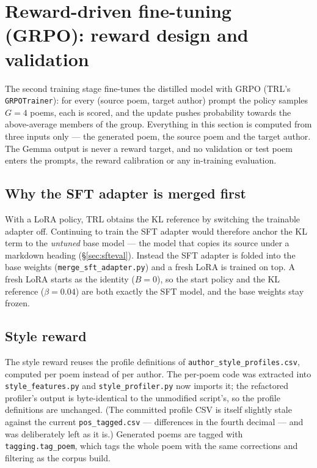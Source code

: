 \documentclass[11pt]{article}
\begin{document}
\section{Reward-driven fine-tuning (GRPO): reward design and
validation}\label{sec:grpo}

The second training stage fine-tunes the distilled model with GRPO (TRL's
\texttt{GRPOTrainer}): for every (source poem, target author) prompt the
policy samples $G=4$ poems, each is scored, and the update pushes probability
towards the above-average members of the group. Everything in this section is
computed from three inputs only --- the generated poem, the source poem and
the target author. The Gemma output is never a reward target, and no
validation or test poem enters the prompts, the reward calibration or any
in-training evaluation.

\subsection{Why the SFT adapter is merged first}

With a LoRA policy, TRL obtains the KL reference by switching the trainable
adapter off. Continuing to train the SFT adapter would therefore anchor the
KL term to the \emph{untuned} base model --- the model that copies its
source under a markdown heading (\S\ref{sec:sfteval}). Instead the SFT
adapter is folded into the base weights (\texttt{merge\_sft\_adapter.py})
and a fresh LoRA is trained on top. A fresh LoRA starts as the identity
($B=0$), so the start policy and the KL reference ($\beta=0.04$) are both
exactly the SFT model, and the base weights stay frozen.

\subsection{Style reward}

The style reward reuses the profile definitions of
\texttt{author\_style\_profiles.csv}, computed per poem instead of per author.
The per-poem code was extracted into \texttt{style\_features.py} and
\texttt{style\_profiler.py} now imports it; the refactored profiler's output
is byte-identical to the unmodified script's, so the profile definitions are
unchanged. (The committed profile CSV is itself slightly stale against the
current \texttt{pos\_tagged.csv} --- differences in the fourth decimal --- and
was deliberately left as it is.) Generated poems are tagged with
\texttt{tagging.tag\_poem}, which tags the whole poem with the same
corrections and filtering as the corpus build.
\end{document}
